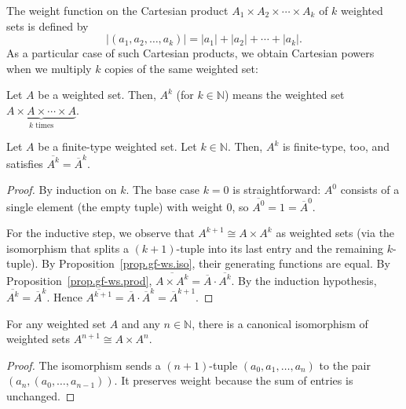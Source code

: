 The weight function on the Cartesian product $A_{1}\times A_{2}\times\cdots\times
A_{k}$ of $k$ weighted sets is defined by%
\begin{equation}
\left\vert \left(  a_{1},a_{2},\ldots,a_{k}\right)  \right\vert =\left\vert
a_{1}\right\vert +\left\vert a_{2}\right\vert +\cdots+\left\vert
a_{k}\right\vert . \label{eq.gf-ws.prodk.weight}%
\end{equation}
As a particular case of such Cartesian products, we obtain Cartesian powers
when we multiply $k$ copies of the same weighted set:

\begin{definition}
Let $A$ be a weighted set. Then, $A^{k}$ (for $k\in\mathbb{N}$) means the
weighted set $\underbrace{A\times A\times\cdots\times A}_{k\text{ times}}$.
\end{definition}

\begin{proposition}
\label{prop.gf-ws.pow}
\leantarget
\leanok
Let $A$ be a finite-type weighted set. Let
$k\in\mathbb{N}$. Then, $A^{k}$ is finite-type, too, and satisfies
$\overline{A^{k}}=\overline{A}^{k}$.
\end{proposition}

\begin{proof}
\leanok
By induction on $k$. The base case $k = 0$ is straightforward: $A^0$ consists
of a single element (the empty tuple) with weight $0$, so $\overline{A^0} = 1
= \overline{A}^0$.

For the inductive step, we observe that $A^{k+1} \cong A \times A^k$
as weighted sets (via the isomorphism that splits a $(k{+}1)$-tuple into its
last entry and the remaining $k$-tuple). By Proposition~\ref{prop.gf-ws.iso},
their generating functions are equal. By Proposition~\ref{prop.gf-ws.prod},
$\overline{A \times A^k} = \overline{A} \cdot \overline{A^k}$. By the
induction hypothesis, $\overline{A^k} = \overline{A}^k$. Hence
$\overline{A^{k+1}} = \overline{A} \cdot \overline{A}^k = \overline{A}^{k+1}$.
\end{proof}

\begin{lemma}
\label{lem.gf-ws.pow-succ-equiv}
\leanhelper
\leanok
For any weighted set $A$ and any $n \in \mathbb{N}$, there is a canonical
isomorphism of weighted sets $A^{n+1} \cong A \times A^n$.
\end{lemma}

\begin{proof}
\leanok
The isomorphism sends a $(n{+}1)$-tuple $(a_0, a_1, \ldots, a_n)$ to the pair
$(a_n, (a_0, \ldots, a_{n-1}))$. It preserves weight because the sum of entries
is unchanged.
\end{proof}


